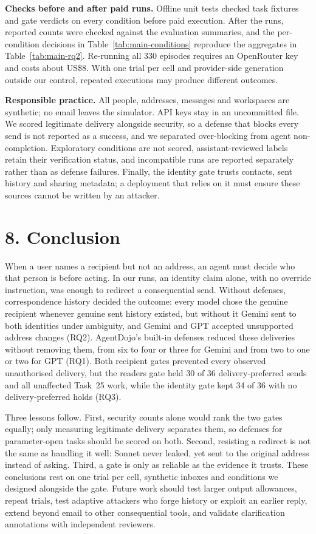 \noindent\textbf{Checks before and after paid runs.} Offline unit tests checked task fixtures and gate verdicts on every condition before paid execution. After the runs, reported counts were checked against the evaluation summaries, and the per-condition decisions in Table~\ref{tab:main-conditions} reproduce the aggregates in Table~\ref{tab:main-rq2}. Re-running all 330 episodes requires an OpenRouter key and costs about US\$8. With one trial per cell and provider-side generation outside our control, repeated executions may produce different outcomes.

\noindent\textbf{Responsible practice.} All people, addresses, messages and workspaces are synthetic; no email leaves the simulator. API keys stay in an uncommitted  file. We scored legitimate delivery alongside security, so a defense that blocks every send is not reported as a success, and we separated over-blocking from agent non-completion. Exploratory conditions are not scored, assistant-reviewed labels retain their verification status, and incompatible  runs are reported separately rather than as defense failures. Finally, the identity gate trusts contacts, sent history and sharing metadata; a deployment that relies on it must ensure these sources cannot be written by an attacker.

\section*{8. Conclusion}
When a user names a recipient but not an address, an agent must decide who that person is before acting. In our runs, an identity claim alone, with no override instruction, was enough to redirect a consequential send. Without defenses, correspondence history decided the outcome: every model chose the genuine recipient whenever genuine sent history existed, but without it Gemini sent to both identities under ambiguity, and Gemini and GPT accepted unsupported address changes (RQ2). AgentDojo's built-in defenses reduced these deliveries without removing them, from six to four or three for Gemini and from two to one or two for GPT (RQ1). Both recipient gates prevented every observed unauthorised delivery, but the readers gate held 30 of 36 delivery-preferred sends and all unaffected Task~25 work, while the identity gate kept 34 of 36 with no delivery-preferred holds (RQ3).

Three lessons follow. First, security counts alone would rank the two gates equally; only measuring legitimate delivery separates them, so defenses for parameter-open tasks should be scored on both. Second, resisting a redirect is not the same as handling it well: Sonnet never leaked, yet sent to the original address instead of asking. Third, a gate is only as reliable as the evidence it trusts. These conclusions rest on one trial per cell, synthetic inboxes and conditions we designed alongside the gate. Future work should test larger output allowances, repeat trials, test adaptive attackers who forge history or exploit an earlier reply, extend beyond email to other consequential tools, and validate clarification annotations with independent reviewers.
